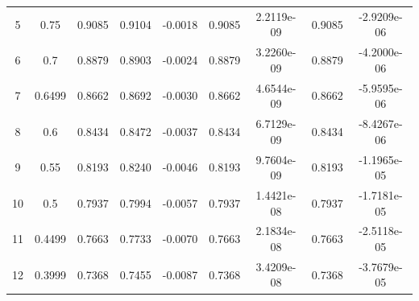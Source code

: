 \documentclass[conference,onecolumn]{IEEEtran}
\begin{document}
\begin{enumerate}
\begin{table}[H]
\begin{tabular}{c c c | c c | c c | c c}
                        5                           & 0.75                   & 0.9085                                 & 0.9104                                       & -0.0018                                   & 0.9085                                       & 2.2119e-09     & 0.9085 & -2.9209e-06    \\
                        6                           & 0.7                    & 0.8879                                 & 0.8903                                       & -0.0024                                   & 0.8879                                       & 3.2260e-09     & 0.8879 & -4.2000e-06    \\
                        7                           & 0.6499                 & 0.8662                                 & 0.8692                                       & -0.0030                                   & 0.8662                                       & 4.6544e-09     & 0.8662 & -5.9595e-06    \\
                        8                           & 0.6                    & 0.8434                                 & 0.8472                                       & -0.0037                                   & 0.8434                                       & 6.7129e-09     & 0.8434 & -8.4267e-06    \\
                        9                           & 0.55                   & 0.8193                                 & 0.8240                                       & -0.0046                                   & 0.8193                                       & 9.7604e-09     & 0.8193 & -1.1965e-05    \\
                        10                          & 0.5                    & 0.7937                                 & 0.7994                                       & -0.0057                                   & 0.7937                                       & 1.4421e-08     & 0.7937 & -1.7181e-05    \\
                        11                          & 0.4499                 & 0.7663                                 & 0.7733                                       & -0.0070                                   & 0.7663                                       & 2.1834e-08     & 0.7663 & -2.5118e-05    \\
                        12                          & 0.3999                 & 0.7368                                 & 0.7455                                       & -0.0087                                   & 0.7368                                       & 3.4209e-08     & 0.7368 & -3.7679e-05    \\

\end{tabular}
\end{table}
\end{enumerate}
\end{document}
